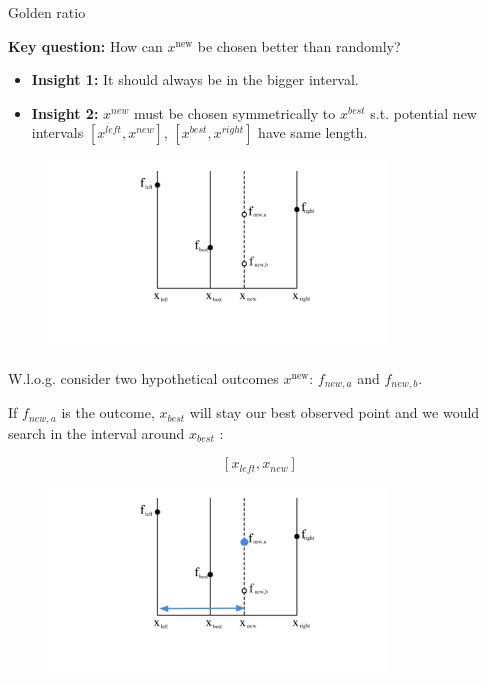 \documentclass[11pt,compress,t,notes=noshow, xcolor=table]{beamer}
\begin{document}
\begin{vbframe}{Golden ratio}

\textbf{Key question:} How can $x^{\text{new}}$ be chosen better than randomly? 

\begin{itemize}
    \item \textbf{Insight 1: } It should always be in the bigger interval.
    \item \textbf{Insight 2: } $x^{new}$ must be chosen symmetrically to $x^{best}$ s.t. potential new intervals $[x^{left}, x^{new}]$, $[x^{best}, x^{right}]$  have same length.
\end{itemize}

\begin{figure}
\includegraphics[width=0.8\textwidth]{figure_man/goldensec-0.png}
\end{figure}

\vspace*{-0.5cm}

W.l.o.g. consider two hypothetical outcomes $x^{\text{new}}$: $f_{new, a}$ and $f_{new, b}$. 

\framebreak

If $f_{new, a}$ is the outcome, $x_{best}$ will stay our best observed point and we would search in the interval around $x_{best}$ : 

$$
    [x_{left}, x_{new}]
$$

\begin{figure}
\includegraphics[width=0.8\textwidth]{figure_man/goldensec-1.png}\\
\end{figure}


\end{vbframe}
\end{document}
